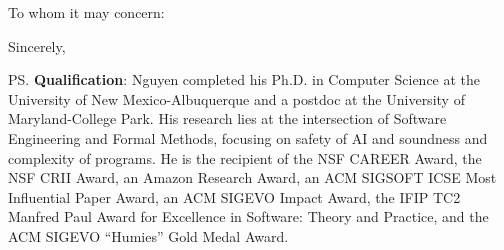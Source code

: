 \documentclass[11pt]{letter}
\begin{document}
\begin{letter}{}

  \date{\textbf{\today}}
  \opening{To whom it may concern:}

  \lipsum[2-8]

  \closing{Sincerely,}


  \ps{\textbf{Qualification}: Nguyen completed his Ph.D. in Computer Science at the University of New Mexico-Albuquerque and a postdoc at the University of Maryland-College Park. His research lies at the intersection of Software Engineering and Formal Methods, focusing on safety of AI and soundness and complexity of programs. He is the recipient of the NSF CAREER Award, the NSF CRII Award, an Amazon Research Award, an ACM SIGSOFT ICSE Most Influential Paper Award, an ACM SIGEVO Impact Award, the IFIP TC2 Manfred Paul Award for Excellence in Software: Theory and Practice, and the ACM SIGEVO ``Humies'' Gold Medal Award.}
\end{letter}
\end{document}
